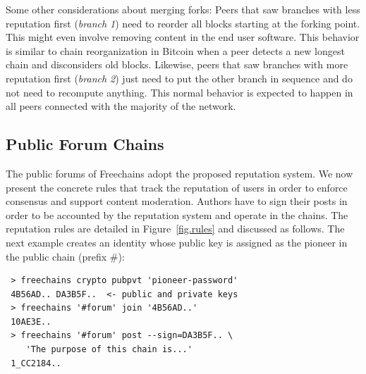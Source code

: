 \documentclass[10pt,journal,compsoc]{IEEEtran}
\newcommand{\FC}       {Freechains\xspace}
\newcommand{\reps}     {\emph{reps}\xspace}
\begin{document}
Some other considerations about merging forks:
Peers that saw branches with less reputation first (\emph{branch 1}) need to
reorder all blocks starting at the forking point.
This might even involve removing content in the end user software.
This behavior is similar to chain reorganization in Bitcoin when a peer detects
a new longest chain and disconsiders old blocks.
%
Likewise, peers that saw branches with more reputation first (\emph{branch 2})
just need to put the other branch in sequence and do not need to recompute
anything.
This normal behavior is expected to happen in all peers connected with the
majority of the network.

\subsection{Public Forum Chains}

The public forums of \FC adopt the proposed reputation system.
We now present the concrete rules that track the reputation of users in order
to enforce consensus and support content moderation.
Authors have to sign their posts in order to be accounted by the reputation
system and operate in the chains.
The reputation rules are detailed in Figure~\ref{fig.rules} and discussed as
follows.
The next example creates an identity whose public key is assigned as the
pioneer in the public chain (prefix $\#$):

{\footnotesize
\begin{verbatim}
 > freechains crypto pubpvt 'pioneer-password'
 4B56AD.. DA3B5F..  <- public and private keys
 > freechains '#forum' join '4B56AD..'
 10AE3E..
 > freechains '#forum' post --sign=DA3B5F.. \
    'The purpose of this chain is...'
 1_CC2184..
\end{verbatim}
}
\end{document}
